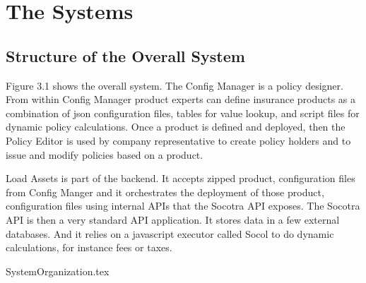 \chapter{The Systems}
\label{intro03} %


\section{Structure of the Overall System}
\label{sec:03:1}

Figure 3.1 shows the overall system. The Config Manager is a policy designer. From within Config
Manager product experts can define insurance products as a combination of json configuration
files, tables for value lookup, and script files for dynamic policy calculations. Once a product
is defined and deployed, then the Policy Editor is used by company representative to create
policy holders and to issue and modify policies based on a product.

Load Assets is part of the backend. It accepts zipped product, configuration files from Config Manger and
it orchestrates the deployment of those product, configuration files using internal APIs that the
Socotra API exposes. The Socotra API is then a very standard API application. It stores data in
a few external databases. And it relies on a javascript executor called Socol to do dynamic calculations,
for instance fees or taxes.

{SystemOrganization.tex}

